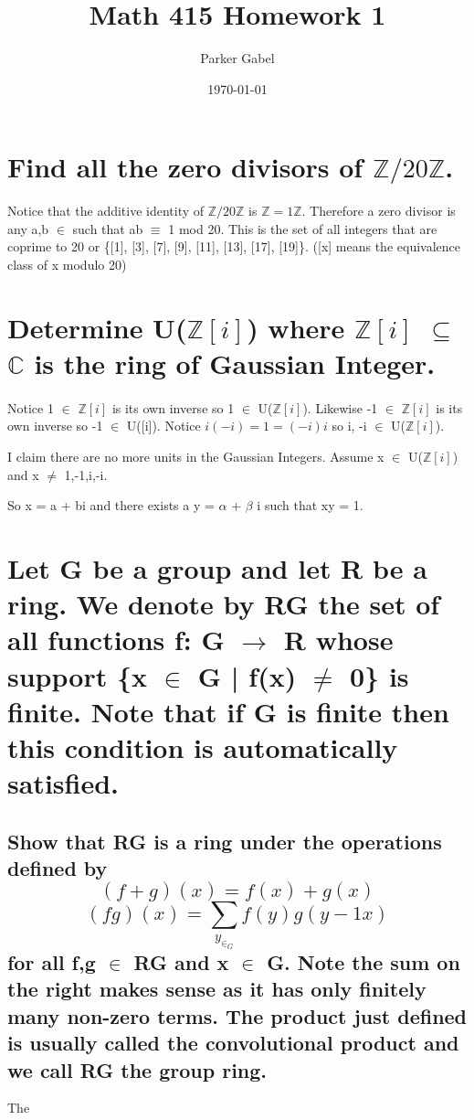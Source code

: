 \documentclass[11pt]{article}
\author{Parker Gabel}
\date{\today}
\title{Math 415 Homework 1}
\begin{document}
\maketitle

\section{Find all the zero divisors of \(\mathbb{Z}/20\mathbb{Z}\).}
\label{sec:orgcd9f18b}
Notice that the additive identity of \(\mathbb{Z}/20\mathbb{Z}\) is \(\mathbb{Z} = 1 \mathbb{Z}\). 
Therefore a zero divisor is any a,b \(\in\)  such that ab \(\equiv\) 1 mod 20. This is the set of all integers that are coprime to 20 or \{[1], [3], [7], [9], [11], [13], [17], [19]\}. ([x] means the equivalence class of x modulo 20)

\section{Determine U(\(\mathbb{Z}[i]\)) where \(\mathbb{Z}[i]\) \(\subseteq\) \(\mathbb{C}\) is the ring of Gaussian Integer.}
\label{sec:orga9996ba}
\paragraph{}
Notice 1 \(\in\) \(\mathbb{Z}[i]\) is its own inverse so 1 \(\in\) U(\(\mathbb{Z}[i]\)). Likewise -1 \(\in\) \(\mathbb{Z}[i]\) is its own inverse so -1 \(\in\) U([i]).
Notice \(i(-i) = 1 = (-i)i\) so i, -i \(\in\) U(\(\mathbb{Z}[i]\)). \par 
I claim there are no more units in the Gaussian Integers.
Assume x \(\in\) U(\(\mathbb{Z}[i]\)) and x \(\ne\) 1,-1,i,-i. \par
So x = a + bi and there exists a y = \(\alpha\) + \(\beta\) i such that xy = 1. \par

\section{Let G be a group and let R be a ring.  We denote by RG the set of all functions f: G \(\to\) R whose support \{x \(\in\) G | f(x) \(\ne\) 0\} is finite.  Note that if G is finite then this condition is automatically satisfied.}
\label{sec:org93838a6}
\subsection{Show that RG is a ring under the operations defined by \[(f+g)(x) =f(x) +g(x)\]    \[(fg)(x) =\sum_y_\in_G f(y)g(y-1x) \]for all f,g \(\in\) RG and x \(\in\) G.  Note the sum on the right makes sense as it has only finitely many non-zero terms. The product just defined is usually called the convolutional product and we call RG the group ring.}
\label{sec:org907ed7d}
The 
\end{document}
